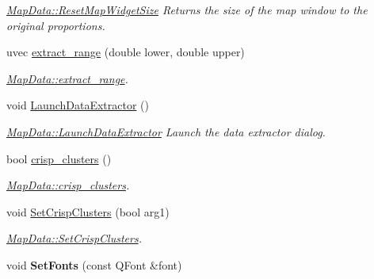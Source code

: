 \begin{DoxyCompactItemize}
\begin{DoxyCompactList}\small\item\em \hyperlink{class_map_data_a795493559eec5070c21ba9561af583d9}{Map\+Data\+::\+Reset\+Map\+Widget\+Size} Returns the size of the map window to the original proportions. \end{DoxyCompactList}\item 
uvec \hyperlink{class_map_data_a9a36051c2e38bc6dd21c1452cabdf56d}{extract\+\_\+range} (double lower, double upper)
\begin{DoxyCompactList}\small\item\em \hyperlink{class_map_data_a9a36051c2e38bc6dd21c1452cabdf56d}{Map\+Data\+::extract\+\_\+range}. \end{DoxyCompactList}\item 
void \hyperlink{class_map_data_a2788d8eab92222a00724772fdd997b1f}{Launch\+Data\+Extractor} ()\hypertarget{class_map_data_a2788d8eab92222a00724772fdd997b1f}{}\label{class_map_data_a2788d8eab92222a00724772fdd997b1f}

\begin{DoxyCompactList}\small\item\em \hyperlink{class_map_data_a2788d8eab92222a00724772fdd997b1f}{Map\+Data\+::\+Launch\+Data\+Extractor} Launch the data extractor dialog. \end{DoxyCompactList}\item 
bool \hyperlink{class_map_data_a769fa8b15df27ed067a951ea1427c894}{crisp\+\_\+clusters} ()
\begin{DoxyCompactList}\small\item\em \hyperlink{class_map_data_a769fa8b15df27ed067a951ea1427c894}{Map\+Data\+::crisp\+\_\+clusters}. \end{DoxyCompactList}\item 
void \hyperlink{class_map_data_a8d9e7f2a19b116370354f06150af1cbe}{Set\+Crisp\+Clusters} (bool arg1)
\begin{DoxyCompactList}\small\item\em \hyperlink{class_map_data_a8d9e7f2a19b116370354f06150af1cbe}{Map\+Data\+::\+Set\+Crisp\+Clusters}. \end{DoxyCompactList}\item 
void {\bfseries Set\+Fonts} (const Q\+Font \&font)\hypertarget{class_map_data_a60100b519b8e081cad23925043b3c024}{}\label{class_map_data_a60100b519b8e081cad23925043b3c024}

\end{DoxyCompactItemize}
